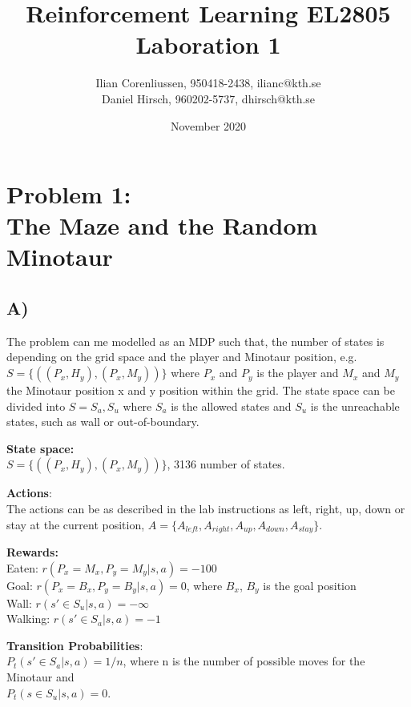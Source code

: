 \documentclass{article}
\title{Reinforcement Learning EL2805\\
       Laboration 1}
\author{Ilian Corenliussen, 950418-2438, ilianc@kth.se\\ 
        Daniel Hirsch, 960202-5737, dhirsch@kth.se}
\date{November 2020}
\begin{document}
\maketitle

\section*{Problem 1: \\
        The Maze and the Random Minotaur}
\subsection*{A)}
The problem can me modelled as an MDP such that, the number of states is depending on the grid space and the player and Minotaur position, e.g. $S = \{((P_x, H_y),(P_x, M_y) )\} $ where $P_x$ and $P_y$ is the player and $M_x$ and $M_y$ the Minotaur position x and y position within the grid. The state space can be divided into $S = {S_a, S_u}$ where $S_a$ is the allowed states and $S_u$ is the unreachable states, such as wall or out-of-boundary.


\textbf{State space:}\\
$S = \{((P_x, H_y),(P_x, M_y) )\} $, 3136 number of states. 

\textbf{Actions}: \\
The actions can be as described in the lab instructions as left, right, up, down or stay at the current position, $A = \{ A_{left}, A_{right}, A_{up}, A_{down}, A_{stay} \}$. 

\textbf{Rewards:} \\
Eaten: $r(P_x = M_x , P_y = M_y |s,a) = -100 $\\ 
Goal: $r(P_x = B_x , P_y = B_y |s,a) = 0 $, where $B_x$, $B_y$ is the goal position\\
Wall: $r(s'\in S_u |s,a) = -\infty $\\
Walking: $r(s'\in S_a |s,a) = -1 $

\textbf{Transition Probabilities}:\\
$P_t(s' \in S_a |s,a) = 1/n$, where n is the number of possible moves for the Minotaur and \\$P_t(s \in S_u |s,a) = 0$. 
\end{document}
